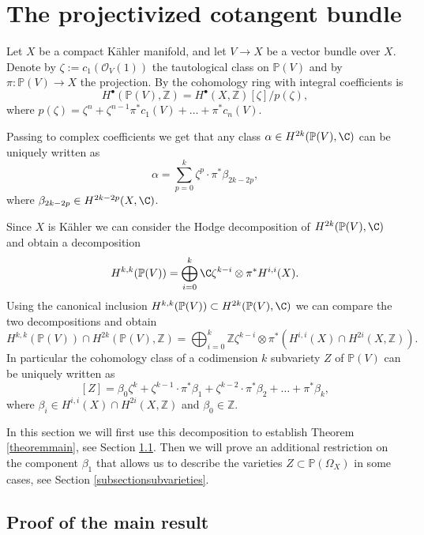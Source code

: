 \documentclass[JEP,XML,SOM,Unicode,NoEqCountersInSection,published]{cedram}
\let\mathcal\mathscr
\newcommand{\sbullet}{{\scriptscriptstyle\bullet}}
\theoremstyle{plain}
\theoremstyle{definition}
\newcommand{\Z}{\ensuremath{\mathbb{Z}}}
\newcommand{\PP}{\ensuremath{\mathbb{P}}}
\newcommand{\holom}[3]{\ensuremath{#1:#2\to #3}}
\newcommand\sO{{\mathcal O}}
\begin{document}
\section{The projectivized cotangent bundle} \label{sectionsubvarieties}

Let $X$ be a compact Kähler manifold,
and let $V \to X$ be a vector bundle over $X$. Denote by $\zeta:=c_1(\sO_V(1))$ the tautological
class on $\PP(V)$ and by $\holom{\pi}{\PP(V)}{X}$ the projection.
By \cite[Chap.\,2]{Kob87} the cohomology ring with integral coefficients is
\[
H^{\sbullet}(\PP(V),\Z)=H^{\sbullet}(X, \Z )[\zeta]/p(\zeta),
\]
where $p(\zeta)=\zeta^n+\zeta^{n-1} \pi^* c_1(V)+ \ldots + \pi^* c_{n}(V)$. 

Passing to complex coefficients we get that any class $\alpha \in H^{2k}(\PP(V),\C) $ can be uniquely written as
\[
\alpha= \sum_{p=0}^{k} \zeta^p \cdot \pi^* \beta_{2k-2p},
\]
where $\beta_{2k-2p} \in H^{2k-2p}(X, \C)$.

Since $X$ is Kähler we can consider the Hodge decomposition
of $H^{2k}(\PP(V),\C)$
and obtain a decomposition
\[
H^{k,k}(\PP(V))=\bigoplus_{i=0}^k \C \zeta^{k-i} \otimes \pi^* H^{i,i}(X).
\]
Using the canonical inclusion $H^{k,k}(\PP(V)) \subset H^{2k}(\PP(V),\C)$
we can compare the two decompositions and obtain
\begin{equation} \label{decomposecohomology}
H^{k,k}(\PP(V))\cap H^{2k}(\PP(V),\Z)=\bigoplus_{i=0}^k \Z \zeta^{k-i} \otimes \pi^* (H^{i,i}(X)\cap H^{2i}(X,\Z ) ).
\end{equation}
In particular the cohomology class of a codimension $k$ subvariety $Z$ of $\PP(V)$ can be uniquely written as
\begin{equation} \label{decompose}
[Z]=\beta_0 \zeta^k + \zeta^{k-1}\cdot \pi^* \beta_1 + \zeta^{k-2}\cdot \pi^* \beta_2 + \ldots + \pi^* \beta_k,
\end{equation}
where $\beta_i\in H^{i,i}(X)\cap H^{2i}(X,\Z )$ and $\beta_0 \in \Z$.

In this section we will first use this decomposition to establish Theorem \ref{theoremmain}, see Section \ref{subsectionproofmain}.
Then we will prove an additional restriction on the component $\beta_1$ that allows us
to describe the varieties $Z \subset \PP(\Omega_X)$ in some cases, see Section \ref{subsectionsubvarieties}.

\subsection{Proof of the main result} \label{subsectionproofmain}
\end{document}
